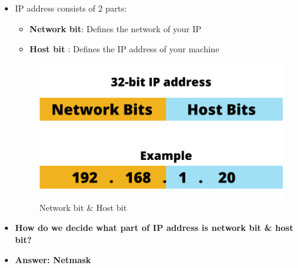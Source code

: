 \setlength{\columnsep}{3pt}
\begin{flushleft}
	
	\begin{itemize}
		
		\item IP address consists of 2 parts:
		\begin{itemize}
			\item \textbf{Network bit}: Defines the network of your IP
			\item \textbf{Host bit} : Defines the IP address of your machine
		\end{itemize}
		\begin{figure}[h!]
			\centering
			\includegraphics[scale=0.6]{content/chapter14/images/network_host.png}
			\caption{Network bit \& Host bit}
			\label{fig:network_host}
		\end{figure}
		\item \textbf{How do we decide what part of IP address is network bit \& host bit?}
		\item \textbf{Answer: Netmask}
		\newpage
	\end{itemize}
		
	
\end{flushleft}
\newpage


